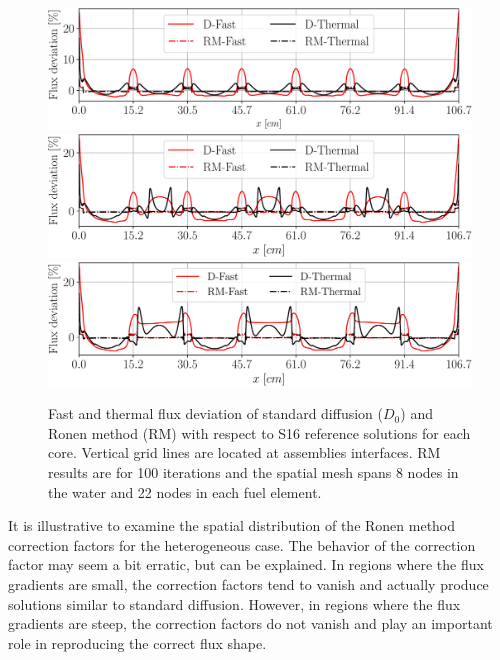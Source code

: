 \begin{figure}[htbp!]
	\centering
	\includegraphics[width=0.6\linewidth]{flx_err_diff_C1.pdf}
	\includegraphics[width=0.6\linewidth]{flx_err_diff_C2.pdf}
	\includegraphics[width=0.6\linewidth]{flx_err_diff_C3.pdf}
	\caption{Fast and thermal flux deviation of standard diffusion ($D_0$) and Ronen method (RM) with respect to S16 reference solutions for each core. Vertical grid lines are located at assemblies interfaces. RM results are for 100 iterations and the spatial mesh spans 8 nodes in the water and 22 nodes in each fuel element.}
	\label{fig:hetero-flux-dev}
\end{figure}

It is illustrative to examine the spatial distribution of the Ronen method correction factors for the heterogeneous case. The behavior of the correction factor may seem a bit erratic, but can be explained. In regions where the flux gradients are small, the correction factors tend to vanish and actually produce solutions similar to standard diffusion. However, in regions where the flux gradients are steep, the correction factors do not vanish and play an important role in reproducing the correct flux shape.





